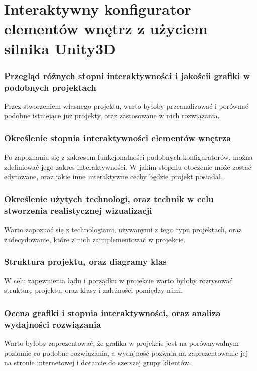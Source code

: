 \documentclass[12pt]{article}
\begin{document}
\tabelka

\section*{Interaktywny konfigurator elementów wnętrz z użyciem silnika Unity3D}

\subsubsection{Przegląd różnych stopni interaktywności i jakościi grafiki w podobnych projektach}
Przez stworzeniem własnego projektu, warto byłoby przeanalizować i porównać podobne istniejące już projekty, oraz zastosowane w nich rozwiązania.
\\
\subsubsection{Określenie stopnia interaktywności elementów wnętrza}
Po zapoznaniu się z zakresem funkcjonalności podobnych konfiguratorów, można zdefiniować jego zakres interaktywności. W jakim stopniu otoczenie może zostać edytowane, oraz jakie inne interaktywne cechy będzie projekt posiadał.
\\
\subsubsection{Określenie użytych technologi, oraz technik w celu stworzenia realistycznej wizualizacji}
Warto zapoznać się z technologiami, używanymi z tego typu projektach, oraz zadecydowanie, które z nich zaimplementować w projekcie. 
\\
\subsubsection{Struktura projektu, oraz diagramy klas}
W celu zapewnienia łądu i porządku w projekcie warto byłoby rozrysować strukturę projektu, oraz klasy i zależności pomiędzy nimi.
\\
\subsubsection{Ocena grafiki i stopnia interaktywności, oraz analiza wydajności rozwiązania}
Warto byłoby zaprezentować, że grafika w projekcie jest na porównywalnym poziomie co podobne rozwiązania, a wydajność pozwala na zaprezentowanie jej na stronie internetowej i dotarcie do szerszej grupy klientów.
\\
\end{document}
